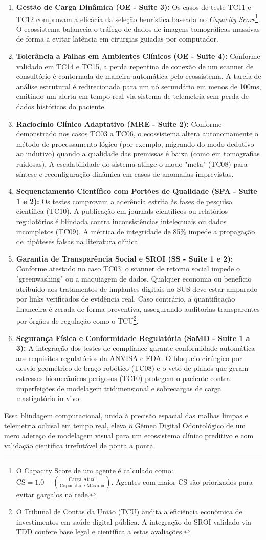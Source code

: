 \begin{enumerate}
    \item \textbf{Gestão de Carga Dinâmica (OE - Suite 3):} Os casos de teste TC11 e TC12 comprovam a eficácia da seleção heurística baseada no \textit{Capacity Score}\footnote{O Capacity Score de um agente é calculado como: $\text{CS} = 1.0 - \left(\frac{\text{Carga Atual}}{\text{Capacidade Máxima}}\right)$. Agentes com maior CS são priorizados para evitar gargalos na rede.}. O ecossistema balanceia o tráfego de dados de imagens tomográficas massivas de forma a evitar latência em cirurgias guiadas por computador.
    \item \textbf{Tolerância a Falhas em Ambientes Clínicos (OE - Suite 4):} Conforme validado em TC14 e TC15, a perda repentina de conexão de um scanner de consultório é contornada de maneira automática pelo ecossistema. A tarefa de análise estrutural é redirecionada para um nó secundário em menos de 100ms, emitindo um alerta em tempo real via sistema de telemetria sem perda de dados históricos do paciente.
    \item \textbf{Raciocínio Clínico Adaptativo (MRE - Suite 2):} Conforme demonstrado nos casos TC03 a TC06, o ecossistema altera autonomamente o método de processamento lógico (por exemplo, migrando do modo dedutivo ao indutivo) quando a qualidade das premissas é baixa (como em tomografias ruidosas). A escalabilidade do sistema atinge o modo "meta" (TC08) para síntese e reconfiguração dinâmica em casos de anomalias imprevistas.
    \item \textbf{Sequenciamento Científico com Portões de Qualidade (SPA - Suite 1 e 2):} Os testes comprovam a aderência estrita às fases de pesquisa científica (TC10). A publicação em journals científicos ou relatórios regulatórios é blindada contra inconsistências intelectuais ou dados incompletos (TC09). A métrica de integridade de 85\% impede a propagação de hipóteses falsas na literatura clínica.
    \item \textbf{Garantia de Transparência Social e SROI (SS - Suite 1 e 2):} Conforme atestado no caso TC03, o scanner de retorno social impede o "greenwashing" ou a maquiagem de dados. Qualquer economia ou benefício atribuído aos tratamentos de implantes digitais no SUS deve estar amparado por links verificados de evidência real. Caso contrário, a quantificação financeira é zerada de forma preventiva, assegurando auditorias transparentes por órgãos de regulação como o TCU\footnote{O Tribunal de Contas da União (TCU) audita a eficiência econômica de investimentos em saúde digital pública. A integração do SROI validado via TDD confere base legal e científica a estas avaliações.}.
    \item \textbf{Segurança Física e Conformidade Regulatória (SaMD - Suite 1 a 3):} A integração dos testes de compliance garante conformidade automática aos requisitos regulatórios da ANVISA e FDA. O bloqueio cirúrgico por desvio geométrico de braço robótico (TC08) e o veto de planos que geram estresses biomecânicos perigosos (TC10) protegem o paciente contra imperfeições de modelagem tridimensional e sobrecargas de carga mastigatória in vivo.
\end{enumerate}

Essa blindagem computacional, unida à precisão espacial das malhas limpas e telemetria oclusal em tempo real, eleva o Gêmeo Digital Odontológico de um mero adereço de modelagem visual para um ecossistema clínico preditivo e com validação científica irrefutável de ponta a ponta.
